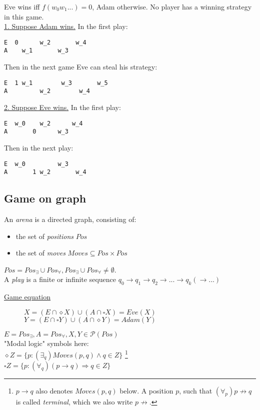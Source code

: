 \noindent
Eve wins iff $f(w_0w_1...) = 0$, Adam otherwise. No player has a winning strategy
in this game.\\
\underline{1. Suppose Adam wins.} In the first play:
\begin{verbatim}
E  0      w_2       w_4
A    w_1       w_3
\end{verbatim}
Then in the next game Eve can steal his strategy:
\begin{verbatim}
E  1 w_1        w_3       w_5
A         w_2        w_4
\end{verbatim}
\underline{2. Suppose Eve wins.} In the first play:
\begin{verbatim}
E  w_0    w_2      w_4
A       0      w_3
\end{verbatim}
Then in the next play:
\begin{verbatim}
E  w_0         w_3
A       1 w_2       w_4
\end{verbatim}

\subsection*{Game on graph}
An \textit{arena} is a directed graph, consisting of:
\begin{itemize}
	\item the set of \textit{positions} $Pos$
	\item the set of \textit{moves} $Moves \subseteq Pos \times Pos$
\end{itemize}
$Pos = Pos_{\exists} \cup Pos_{\forall}, Pos_{\exists} \cup Pos_{\forall} \neq \emptyset$.\\
A \textit{play} is a finite or infinite sequence
$q_0 \rightarrow q_1 \rightarrow q_2 \rightarrow ... \rightarrow q_k (\rightarrow ...)$

\noindent
\underline{Game equation}
\begin{figure}[H]
	\centering
	$X = (E \cap \diamond X) \cup (A \cap \square X) = Eve(X)$\\
	$Y = (E \cap \square Y) \cup (A \cap \diamond Y) = Adam(Y)$
\end{figure}
$E = Pos_{\exists}, A = Pos_{\forall}, X, Y \in \mathcal{P}(Pos)$\\
\noindent
"Modal logic" symbols here:\\
$\diamond Z = \{p : (\exists_q) Moves(p, q) \land q \in Z\}$
\footnote{
	$p \rightarrow q$ also denotes $Moves(p, q)$ below.
	A position $p$, such that $(\forall_p) p\not\rightarrow q$ is called \textit{terminal},
	which we also write $p \not\rightarrow$.
}\\
$\square Z = \{p : (\forall_q) (p \rightarrow q) \Rightarrow q \in Z\}$


